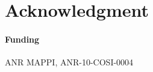 \documentclass{bioinfo}
\begin{document}
\section*{Acknowledgment}

\paragraph{Funding\textcolon} ANR MAPPI, ANR-10-COSI-0004


%
%
%
%
%
%
%




\end{document}
